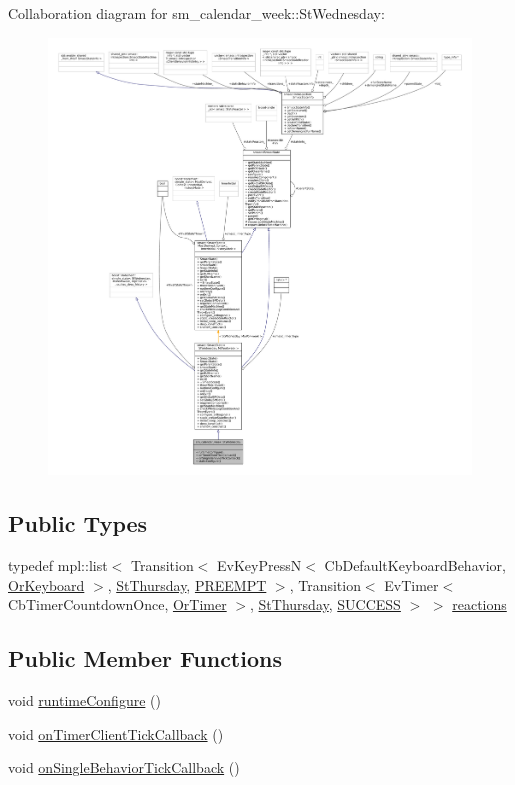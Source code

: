 Collaboration diagram for sm\+\_\+calendar\+\_\+week\+:\+:St\+Wednesday\+:
\nopagebreak
\begin{figure}[H]
\begin{center}
\leavevmode
\includegraphics[width=350pt]{structsm__calendar__week_1_1StWednesday__coll__graph}
\end{center}
\end{figure}
\subsection*{Public Types}
\begin{DoxyCompactItemize}
\item 
typedef mpl\+::list$<$ Transition$<$ Ev\+Key\+PressN$<$ Cb\+Default\+Keyboard\+Behavior, \hyperlink{classsm__calendar__week_1_1OrKeyboard}{Or\+Keyboard} $>$, \hyperlink{structsm__calendar__week_1_1StThursday}{St\+Thursday}, \hyperlink{classPREEMPT}{P\+R\+E\+E\+M\+PT} $>$, Transition$<$ Ev\+Timer$<$ Cb\+Timer\+Countdown\+Once, \hyperlink{classsm__calendar__week_1_1OrTimer}{Or\+Timer} $>$, \hyperlink{structsm__calendar__week_1_1StThursday}{St\+Thursday}, \hyperlink{classSUCCESS}{S\+U\+C\+C\+E\+SS} $>$ $>$ \hyperlink{structsm__calendar__week_1_1StWednesday_aa21e502e00fa09b841f8693bdb05e86d}{reactions}
\end{DoxyCompactItemize}
\subsection*{Public Member Functions}
\begin{DoxyCompactItemize}
\item 
void \hyperlink{structsm__calendar__week_1_1StWednesday_a5f47539c7bdbfaa8c808b5045e95444c}{runtime\+Configure} ()
\item 
void \hyperlink{structsm__calendar__week_1_1StWednesday_a1ee9efe65b63cb472eaaf7c49f072ebc}{on\+Timer\+Client\+Tick\+Callback} ()
\item 
void \hyperlink{structsm__calendar__week_1_1StWednesday_ac7c04230cbb805c53a779f2fa2ca213b}{on\+Single\+Behavior\+Tick\+Callback} ()
\end{DoxyCompactItemize}
